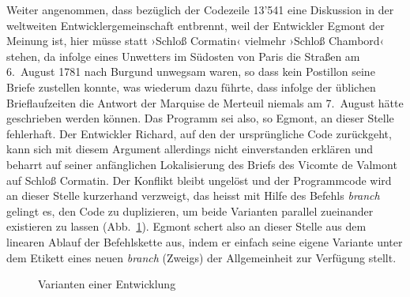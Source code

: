 \documentclass[a4paper,12pt]{article}
\newcommand{\inanf}[1]{›#1‹}
\begin{document}
\begin{comment}

Warum Gefährliche Liebschaften so gut geeignet ist: Relativ in der Zeit, so kommt aber kein Programm durch. Es muss _in_ der Zeit laufen...

Es ist eine Auswahl an Briefen, d.h. es können jederzeit irgendwo noch weitere zwischengeschoben werden... Ein dynamisches Unterfangen.

\end{comment}

Weiter angenommen, dass bezüglich der Codezeile 13'541 eine Diskussion in der weltweiten Entwicklergemeinschaft entbrennt, weil der Entwickler {\color{hokkaido}Egmont} der Meinung ist, hier müsse statt \inanf{Schloß Cormatin} vielmehr \inanf{Schloß Chambord} stehen, da infolge eines Unwetters im Südosten von Paris die Straßen am 6.~August 1781 nach Burgund unwegsam waren, so dass kein Postillon seine Briefe zustellen konnte, was wiederum dazu führte, dass infolge der üblichen Brieflaufzeiten die Antwort der Marquise de Merteuil niemals am 7.~August hätte geschrieben werden können. Das Programm sei also, so {\color{hokkaido}Egmont}, an dieser Stelle fehlerhaft. Der Entwickler {\color{dzug}Richard}, auf den der ursprüngliche Code zurückgeht, kann sich mit diesem Argument allerdings nicht einverstanden erklären und beharrt auf seiner anfänglichen Lokalisierung des Briefs des Vicomte de Valmont auf Schloß Cormatin. Der Konflikt bleibt ungelöst und der Programmcode wird an dieser Stelle kurzerhand verzweigt, das heisst mit Hilfe des Befehls \emph{branch} gelingt es, den Code zu duplizieren, um beide Varianten parallel zueinander existieren zu lassen (Abb.~\ref{abb:ori}). {\color{hokkaido}Egmont} schert also an dieser Stelle aus dem linearen Ablauf der Befehlskette aus, indem er einfach seine eigene Variante unter dem Etikett eines neuen \emph{branch} (Zweigs) der Allgemeinheit zur Verfügung stellt.

\begin{figure}[hpt]
\begin{center}
\end{center}
\caption{Varianten einer Entwicklung}\label{abb:ori}
\end{figure}
\end{document}
